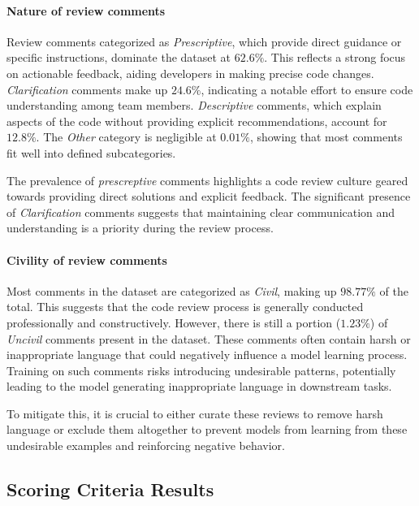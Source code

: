 \paragraph*{\textbf{Nature of review comments}}

Review comments categorized as \emph{Prescriptive}, which provide direct guidance or specific instructions, dominate the dataset at $62.6\%$. This reflects a strong focus on actionable feedback, aiding developers in making precise code changes. \emph{Clarification} comments make up $24.6\%$, indicating a notable effort to ensure code understanding among team members. \emph{Descriptive} comments, which explain aspects of the code without providing explicit recommendations, account for $12.8\%$.
The \emph{Other} category is negligible at $0.01\%$, showing that most comments fit well into defined subcategories.

The prevalence of \emph{prescreptive} comments highlights a code review culture geared towards providing direct solutions and explicit feedback. The significant presence of \emph{Clarification} comments suggests that maintaining clear communication and understanding is a priority during the review process.


\paragraph*{\textbf{Civility of review comments}}

Most comments in the dataset are categorized as \emph{Civil}, making up $98.77\%$ of the total. This suggests that the code review process is generally conducted professionally and constructively. However, there is still a portion ($1.23\%$) of \emph{Uncivil} comments present in the dataset. These comments often contain harsh or inappropriate language that could negatively influence a model learning process.
Training on such comments risks introducing undesirable patterns, potentially leading to the model generating inappropriate language in downstream tasks.

To mitigate this, it is crucial to either curate these reviews to remove harsh language or exclude them altogether to prevent models from learning from these undesirable examples and reinforcing negative behavior.


\subsection{Scoring Criteria Results}

